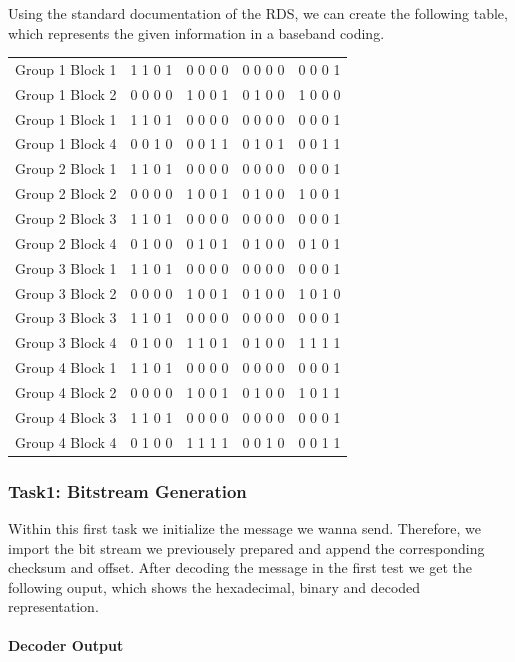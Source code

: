 \documentclass[sigconf]{acmart}
\begin{document}
Using the standard documentation of the RDS, we can create the following
table, which represents the given information in a baseband coding.

\begin{center}
  \begin{tabular}{ l | c | c | c | r}
    \hline
Group 1 Block 1 & 1 1 0 1 & 0 0 0 0 & 0 0 0 0 & 0 0 0 1\tabularnewline
Group 1 Block 2 & 0 0 0 0 & 1 0 0 1 & 0 1 0 0 & 1 0 0 0\tabularnewline
Group 1 Block 1 & 1 1 0 1 & 0 0 0 0 & 0 0 0 0 & 0 0 0 1\tabularnewline
Group 1 Block 4 & 0 0 1 0 & 0 0 1 1 & 0 1 0 1 & 0 0 1 1\tabularnewline
Group 2 Block 1 & 1 1 0 1 & 0 0 0 0 & 0 0 0 0 & 0 0 0 1\tabularnewline
Group 2 Block 2 & 0 0 0 0 & 1 0 0 1 & 0 1 0 0 & 1 0 0 1\tabularnewline
Group 2 Block 3 & 1 1 0 1 & 0 0 0 0 & 0 0 0 0 & 0 0 0 1\tabularnewline
Group 2 Block 4 & 0 1 0 0 & 0 1 0 1 & 0 1 0 0 & 0 1 0 1\tabularnewline
Group 3 Block 1 & 1 1 0 1 & 0 0 0 0 & 0 0 0 0 & 0 0 0 1\tabularnewline
Group 3 Block 2 & 0 0 0 0 & 1 0 0 1 & 0 1 0 0 & 1 0 1 0\tabularnewline
Group 3 Block 3 & 1 1 0 1 & 0 0 0 0 & 0 0 0 0 & 0 0 0 1\tabularnewline
Group 3 Block 4 & 0 1 0 0 & 1 1 0 1 & 0 1 0 0 & 1 1 1 1\tabularnewline
Group 4 Block 1 & 1 1 0 1 & 0 0 0 0 & 0 0 0 0 & 0 0 0 1\tabularnewline
Group 4 Block 2 & 0 0 0 0 & 1 0 0 1 & 0 1 0 0 & 1 0 1 1\tabularnewline
Group 4 Block 3 & 1 1 0 1 & 0 0 0 0 & 0 0 0 0 & 0 0 0 1\tabularnewline
Group 4 Block 4 & 0 1 0 0 & 1 1 1 1 & 0 0 1 0 & 0 0 1 1\tabularnewline
    \hline
  \end{tabular}
\end{center}

\hypertarget{Task1:ux20Bitstreamux20Generation}{%
\subsubsection{Task1: Bitstream
Generation}\label{Task1:ux20Bitstreamux20Generation}}

Within this first task we initialize the message we wanna send.
Therefore, we import the bit stream we previousely prepared and append
the corresponding checksum and offset. After decoding the message in the
first test we get the following ouput, which shows the hexadecimal,
binary and decoded representation.

\hypertarget{Decoderux20Output}{%
\paragraph{Decoder Output}\label{Decoderux20Output}}
\end{document}
